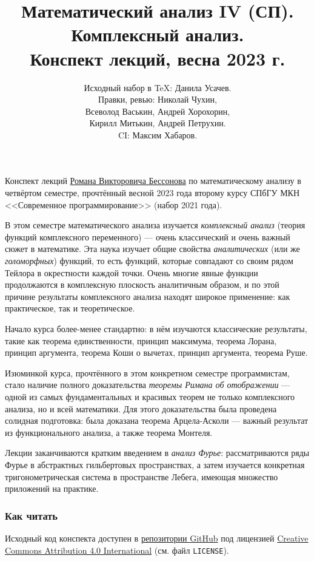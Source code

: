 \documentclass[a4paper,14pt]{extarticle}
\title{Математический анализ IV (СП). \\ Комплексный анализ. \\ Конспект лекций, весна 2023 г.}
\author{Исходный набор в \TeX: Данила Усачев. \\ Правки, ревью: Николай Чухин, \\ Всеволод Васькин, Андрей Хорохорин, \\ Кирилл Митькин, Андрей Петрухин. \\ CI: Максим Хабаров.}
\date{}
\theoremstyle{definition}
\theoremstyle{plain}
\theoremstyle{plain}
\theoremstyle{plain}
\theoremstyle{plain}
\theoremstyle{definition}
\theoremstyle{definition}
\theoremstyle{definition}
\theoremstyle{definition}
\theoremstyle{definition}
\theoremstyle{definition}
\theoremstyle{definition}
\theoremstyle{definition}
\theoremstyle{definition}
\theoremstyle{definition}
\theoremstyle{definition}
\theoremstyle{plain}
\theoremstyle{plain}
\theoremstyle{plain}
\theoremstyle{plain}
\theoremstyle{definition}
\theoremstyle{definition}
\theoremstyle{definition}
\theoremstyle{definition}
\theoremstyle{definition}
\theoremstyle{definition}
\begin{document}
\maketitle
Конспект лекций \href{https://math-cs.spbu.ru/people/bessonov-r-v/}{\color{blue}Романа Викторовича Бессонова} по математическому анализу в четвёртом семестре, прочтённый весной 2023 года второму курсу СПбГУ МКН <<Современное программирование>> (набор 2021 года).

В этом семестре математического анализа изучается \emph{комплексный анализ} (теория функций комплексного переменного) --- очень классический и очень важный сюжет в математике. Эта наука изучает общие свойства \emph{аналитических} (или же \emph{голоморфных}) функций, то есть функций, которые совпадают со своим рядом Тейлора в окрестности каждой точки. Очень многие явные функции продолжаются в комплексную плоскость аналитичным образом, и по этой причине результаты комплексного анализа находят широкое применение: как практическое, так и теоретическое.

Начало курса более-менее стандартно: в нём изучаются классические результаты, такие как теорема единственности, принцип максимума, теорема Лорана, принцип аргумента, теорема Коши о вычетах, принцип аргумента, теорема Руше.

Изюминкой курса, прочтённого в этом конкретном семестре программистам, стало наличие полного доказательства \emph{теоремы Римана об отображении} --- одной из самых фундаментальных и красивых теорем не только комплексного анализа, но и всей математики. Для этого доказательства была проведена солидная подготовка: была доказана теорема Арцела-Асколи --- важный результат из функционального анализа, а также теорема Монтеля.

Лекции заканчиваются кратким введением в \emph{анализ Фурье}: рассматриваются ряды Фурье в абстрактных гильбертовых пространствах, а затем изучается конкретная тригонометрическая система в пространстве Лебега, имеющая множество приложений на практике.

\newpage
\subsubsection*{Как читать}
Исходный код конспекта доступен в  \href{https://github.com/koreshaSp/matan2/releases}{\color{blue}репозитории GitHub} под лицензией \href{https://creativecommons.org/licenses/by/4.0/}{\color{blue}Creative Commons Attribution 4.0 International} (см. файл \texttt{LICENSE}).
\end{document}

